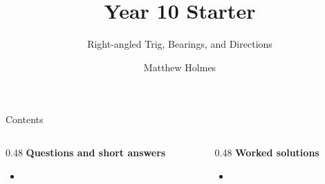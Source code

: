 \documentclass[aspectratio=169,11pt]{beamer}
\title{Year 10 Starter}
\subtitle{Right-angled Trig, Bearings, and Directions}
\author{Matthew Holmes}
\date{} %
\begin{document}
\frame{\titlepage}

\begin{frame}{Contents}
\small
\begin{columns}[T]
\begin{column}{0.48\textwidth}
\textbf{Questions and short answers}
\begin{itemize}
\item \hyperlink{q-st1}{}
\end{itemize}
\end{column}
\begin{column}{0.48\textwidth}
\textbf{Worked solutions}
\begin{itemize}
\item \hyperlink{work-st1}{}
\end{itemize}
\end{column}
\end{columns}
\end{frame}
\end{document}
